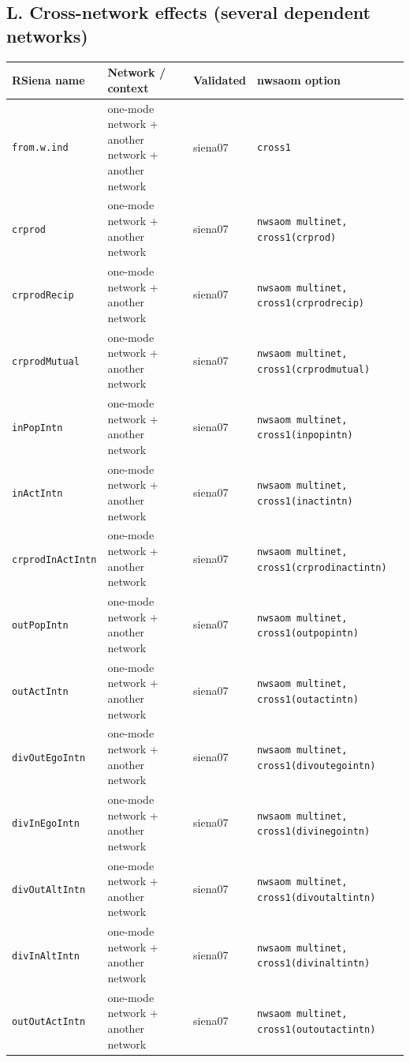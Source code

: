 \subsection*{L. Cross-network effects (several dependent networks)}
\footnotesize
\begin{longtable}{@{}p{2.6cm}p{3.2cm}p{2.9cm}p{5.4cm}@{}}
\toprule
RSiena name & Network / context & Validated & nwsaom option\\
\midrule
\endhead
\texttt{from.w.ind} & one-mode network + another network + another network & siena07 & \texttt{cross1}\\
\texttt{crprod} & one-mode network + another network & siena07 & \texttt{nwsaom multinet, cross1(crprod)}\\
\texttt{crprodRecip} & one-mode network + another network & siena07 & \texttt{nwsaom multinet, cross1(crprodrecip)}\\
\texttt{crprodMutual} & one-mode network + another network & siena07 & \texttt{nwsaom multinet, cross1(crprodmutual)}\\
\texttt{inPopIntn} & one-mode network + another network & siena07 & \texttt{nwsaom multinet, cross1(inpopintn)}\\
\texttt{inActIntn} & one-mode network + another network & siena07 & \texttt{nwsaom multinet, cross1(inactintn)}\\
\texttt{crprodInActIntn} & one-mode network + another network & siena07 & \texttt{nwsaom multinet, cross1(crprodinactintn)}\\
\texttt{outPopIntn} & one-mode network + another network & siena07 & \texttt{nwsaom multinet, cross1(outpopintn)}\\
\texttt{outActIntn} & one-mode network + another network & siena07 & \texttt{nwsaom multinet, cross1(outactintn)}\\
\texttt{divOutEgoIntn} & one-mode network + another network & siena07 & \texttt{nwsaom multinet, cross1(divoutegointn)}\\
\texttt{divInEgoIntn} & one-mode network + another network & siena07 & \texttt{nwsaom multinet, cross1(divinegointn)}\\
\texttt{divOutAltIntn} & one-mode network + another network & siena07 & \texttt{nwsaom multinet, cross1(divoutaltintn)}\\
\texttt{divInAltIntn} & one-mode network + another network & siena07 & \texttt{nwsaom multinet, cross1(divinaltintn)}\\
\texttt{outOutActIntn} & one-mode network + another network & siena07 & \texttt{nwsaom multinet, cross1(outoutactintn)}\\

\end{longtable}
